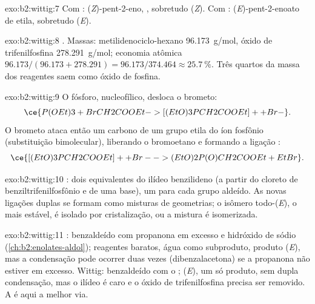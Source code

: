 \begin{solution}{exo:b2:wittig:7}
Com : (\textit{Z})-pent-2-eno, , sobretudo (\textit{Z}). Com
: (\textit{E})-pent-2-enoato de etila, sobretudo (\textit{E}).
\end{solution}

\begin{solution}{exo:b2:wittig:8}
. Massas: metilidenociclo-hexano \qty{96.173}{g/mol},
óxido de trifenilfosfina \qty{278.291}{g/mol}; economia atômica $96.173/(96.173 + 278.291) =
96.173/374.464 \approx 25.7~\%$. Três quartos da massa dos reagentes saem como óxido de fosfina.
\end{solution}

\begin{solution}{exo:b2:wittig:9}
O fósforo, nucleofílico, desloca o brometo:
\begin{equation*}
\ce{P(OEt)3 + BrCH2COOEt -> [(EtO)3PCH2COOEt]+ + Br-}.
\end{equation*}
O brometo
ataca então um carbono de um grupo etila do íon fosfônio (substituição bimolecular), liberando
o bromoetano e formando a ligação :
\begin{equation*}
\ce{[(EtO)3PCH2COOEt]+ + Br- -> (EtO)2P(O)CH2COOEt + EtBr}.
\end{equation*}
\end{solution}

\begin{solution}{exo:b2:wittig:10}
: dois equivalentes do
ilídeo benzilideno (a partir do cloreto de benziltrifenilfosfônio e de uma base), um para cada grupo
aldeído. As novas ligações duplas se formam como misturas de geometrias; o isômero todo-(\textit{E}),
o mais estável, é isolado por cristalização, ou a mistura é isomerizada.
\end{solution}

\begin{solution}{exo:b2:wittig:11}
: benzaldeído com propanona em excesso e hidróxido de sódio (\cref{ch:b2:enolates-aldol});
reagentes baratos, água como subproduto, produto (\textit{E}), mas a condensação pode ocorrer duas
vezes (dibenzalacetona) se a propanona não estiver em excesso. Wittig: benzaldeído com o  ; (\textit{E}), um só produto, sem dupla condensação, mas o ilídeo é caro
e o óxido de trifenilfosfina precisa ser removido. A  é aqui a melhor via.
\end{solution}

